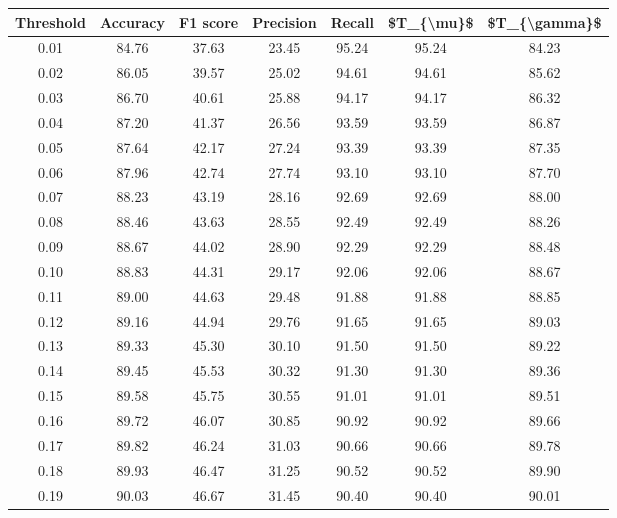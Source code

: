 \begin{tabular}{|c|c|c|c|c|c|c|}
\hline
 Threshold &  Accuracy &  F1 score &  Precision &  Recall &  \$T\_\{\textbackslash mu\}\$ &  \$T\_\{\textbackslash gamma\}\$ \\
\hline
      0.01 &     84.76 &     37.63 &      23.45 &   95.24 &      95.24 &         84.23 \\
      0.02 &     86.05 &     39.57 &      25.02 &   94.61 &      94.61 &         85.62 \\
      0.03 &     86.70 &     40.61 &      25.88 &   94.17 &      94.17 &         86.32 \\
      0.04 &     87.20 &     41.37 &      26.56 &   93.59 &      93.59 &         86.87 \\
      0.05 &     87.64 &     42.17 &      27.24 &   93.39 &      93.39 &         87.35 \\
      0.06 &     87.96 &     42.74 &      27.74 &   93.10 &      93.10 &         87.70 \\
      0.07 &     88.23 &     43.19 &      28.16 &   92.69 &      92.69 &         88.00 \\
      0.08 &     88.46 &     43.63 &      28.55 &   92.49 &      92.49 &         88.26 \\
      0.09 &     88.67 &     44.02 &      28.90 &   92.29 &      92.29 &         88.48 \\
      0.10 &     88.83 &     44.31 &      29.17 &   92.06 &      92.06 &         88.67 \\
      0.11 &     89.00 &     44.63 &      29.48 &   91.88 &      91.88 &         88.85 \\
      0.12 &     89.16 &     44.94 &      29.76 &   91.65 &      91.65 &         89.03 \\
      0.13 &     89.33 &     45.30 &      30.10 &   91.50 &      91.50 &         89.22 \\
      0.14 &     89.45 &     45.53 &      30.32 &   91.30 &      91.30 &         89.36 \\
      0.15 &     89.58 &     45.75 &      30.55 &   91.01 &      91.01 &         89.51 \\
      0.16 &     89.72 &     46.07 &      30.85 &   90.92 &      90.92 &         89.66 \\
      0.17 &     89.82 &     46.24 &      31.03 &   90.66 &      90.66 &         89.78 \\
      0.18 &     89.93 &     46.47 &      31.25 &   90.52 &      90.52 &         89.90 \\
      0.19 &     90.03 &     46.67 &      31.45 &   90.40 &      90.40 &         90.01 \\

\end{tabular}
